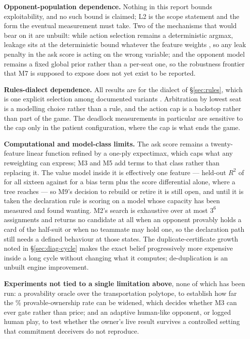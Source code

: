 \textbf{Opponent-population dependence.} Nothing in this report bounds
exploitability, and no such bound is claimed; L2 is the scope statement and
\cite{lisy-lbr} the form the eventual measurement must take. Two of the
mechanisms that would bear on it are unbuilt: while action selection remains a
deterministic argmax, leakage sits at the deterministic bound whatever the
feature weights \cite{alvim-leakage}, so any leak penalty in the ask score is
acting on the wrong variable; and the opponent model remains a fixed global
prior rather than a per-seat one, so the robustness frontier that M7 is supposed
to expose does not yet exist to be reported.

\textbf{Rules-dialect dependence.} All results are for the dialect of
\S\ref{sec:rules}, which is one explicit selection among documented variants
\cite{pagat}. Arbitration by lowest seat is a modelling choice rather than a
rule, and the action cap is a backstop rather than part of the game. The
deadlock measurements in particular are sensitive to the cap only in the patient
configuration, where the cap is what ends the game.

\textbf{Computational and model-class limits.} The ask score remains a
twenty-feature linear function refined by a one-ply expectimax, which caps what
any reweighting can express; M3 and M5 add terms to that class rather than
replacing it. The value model inside it is effectively one feature --- held-out
$R^2$ of \numValueRSq{} for all sixteen against \numValueRSqScore{} for a bias
term plus the score differential alone, where a tree reaches \numValueRSqTree{}
--- so M9's decision to rebuild or retire it is still open, and until it is
taken the declaration rule is scoring on a model whose capacity has been
measured and found wanting. M2's search is exhaustive over at most $3^6$
assignments and returns no candidate at all when an opponent provably holds a
card of the half-suit or when no teammate may hold one, so the declaration path
still needs a defined behaviour at those states. The duplicate-certificate growth
noted in \S\ref{sec:diag-cycle} makes the exact belief progressively more
expensive inside a long cycle without changing what it computes; de-duplication
is an unbuilt engine improvement.

\textbf{Experiments not tied to a single limitation above}, none of which has
been run: a provability oracle over the transportation polytope, to establish how
far the \numProvableOwn\% provable-ownership rate can be widened, which decides
whether M3 can ever gate rather than price; and an adaptive human-like opponent,
or logged human play, to test whether the owner's live result survives a
controlled setting that commitment deceivers do not reproduce.

